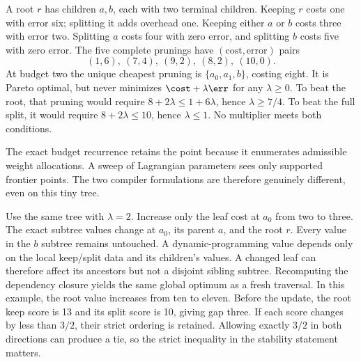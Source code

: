 A root $r$ has children $a,b$, each with two terminal children. Keeping $r$ costs one with error six; splitting it adds overhead one. Keeping either $a$ or $b$ costs three with error two. Splitting $a$ costs four with zero error, and splitting $b$ costs five with zero error.
The five complete prunings have $(\text{cost},\text{error})$ pairs
\[
(1,6),\ (7,4),\ (9,2),\ (8,2),\ (10,0).
\]
At budget two the unique cheapest pruning is $\{a_0,a_1,b\}$, costing eight. It is Pareto optimal, but never minimizes $\cost+\lambda\err$ for any $\lambda\ge0$.
To beat the root, that pruning would require $8+2\lambda\le1+6\lambda$, hence $\lambda\ge7/4$. To beat the full split, it would require $8+2\lambda\le10$, hence $\lambda\le1$. No multiplier meets both conditions.

The exact budget recurrence retains the point because it enumerates admissible weight allocations. A sweep of Lagrangian parameters sees only supported frontier points. The two compiler formulations are therefore genuinely different, even on this tiny tree.

Use the same tree with $\lambda=2$. Increase only the leaf cost at $a_0$ from two to three. The exact subtree values change at $a_0$, its parent $a$, and the root $r$. Every value in the $b$ subtree remains untouched.
A dynamic-programming value depends only on the local keep/split data and its children's values. A changed leaf can therefore affect its ancestors but not a disjoint sibling subtree. Recomputing the dependency closure yields the same global optimum as a fresh traversal. In this example, the root value increases from ten to eleven.
Before the update, the root keep score is 13 and its split score is 10, giving gap three. If each score changes by less than $3/2$, their strict ordering is retained. Allowing exactly $3/2$ in both directions can produce a tie, so the strict inequality in the stability statement matters.

